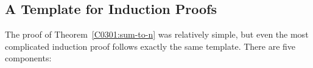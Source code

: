 \iffalse
In effect, we've just proved
that $P(0)$ implies $P(1)$, $P(1)$ implies $P(2)$, $P(2)$ implies
$P(3)$, etc., all in one fell swoop.
\fi

\iffalse
\begin{notesproblem}
Prove by induction on $n$ that
\hyperdef{geometric}{sum}{\begin{equation}\label{geometric-n}
1+r+r^2+\cdots+r^n = \frac{r^{n+1}-1}{r-1}
\end{equation}}
for all $n \in \naturals$ and numbers $r\neq 1$.
\end{notesproblem}
\fi

\subsection{A Template for Induction Proofs}
\label{C0301:templ-induct-proofs}

The proof of Theorem~\ref{C0301:sum-to-n} was relatively simple, but even
the most complicated induction proof follows exactly the same
template.  There are five components:

